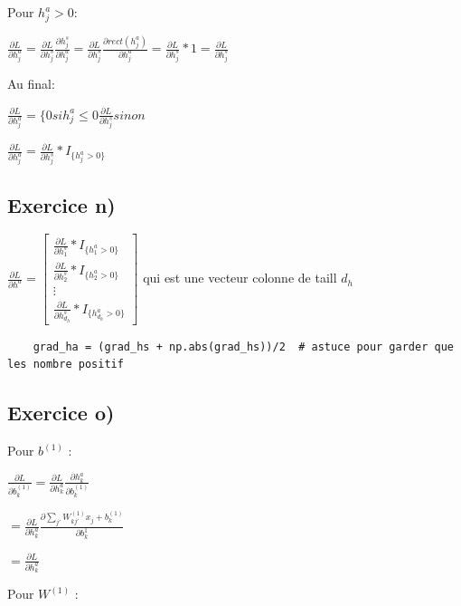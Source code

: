 \documentclass[a4paper,10pt]{article}
\begin{document}
Pour $h^a_j > 0$:

$\frac{\partial L}{\partial h^a_j} = \frac{\partial L}{\partial h^s_j} \frac{\partial h^s_j}{\partial h^a_j} = \frac{\partial L}{\partial h^s_j} \frac{\partial rect(h^a_j)}{\partial h^a_j} = \frac{\partial L}{\partial h^s_j}*1 = \frac{\partial L}{\partial h^s_j}$

Au final:

$\frac{\partial L}{\partial h^a_j} = \lbrace 0 si h^a_j \leq 0 \frac{\partial L}{\partial h^s_j} sinon$

$\frac{\partial L}{\partial h^a_j} = \frac{\partial L}{\partial h^s_j} * I_{\lbrace h^a_j > 0 \rbrace} $

\subsection{Exercice n)}

$\frac{\partial L}{\partial h^a} = \begin{bmatrix}
		\frac{\partial L}{\partial h^s_1} * I_{\lbrace h^a_1 > 0 \rbrace} \\
		\frac{\partial L}{\partial h^s_2} * I_{\lbrace h^a_2 > 0 \rbrace}\\
		\vdots \\
		\frac{\partial L}{\partial h^s_{d_h}}* I_{\lbrace h^a_{d_h} > 0 \rbrace}
		\end{bmatrix}$ qui est une vecteur colonne de taill $d_h$



\begin{verbatim}
	grad_ha = (grad_hs + np.abs(grad_hs))/2  # astuce pour garder que les nombre positif
\end{verbatim}


\subsection{Exercice o)}

Pour $b^{(1)}$ :

$\frac{\partial L}{\partial b^{(1)}_{k}} = \frac{\partial L}{\partial h^{a}_{k}} \frac{\partial h^{a}_{k}}{\partial b^{(1)}_{k}}$

$ = \frac{\partial L}{\partial h^{a}_{k}} \frac{\partial \sum_{j'} W^{(1)}_{kj'} x_{j} + b^{(1)}_{k}}{\partial b^{1}_{k}}$

$ = \frac{\partial L}{\partial h^{a}_{k}}$

Pour $W^{(1)}$ :
\end{document}
